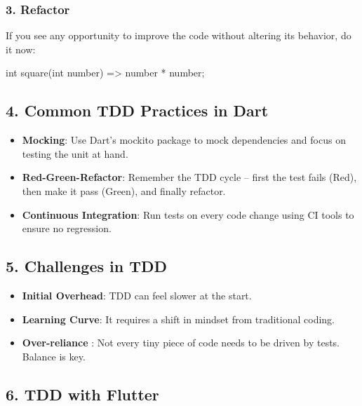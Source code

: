 \documentclass[
]{article}
\newenvironment{Shaded}{\begin{snugshade}}{\end{snugshade}}
\newcommand{\DataTypeTok}[1]{\textcolor[rgb]{0.16,0.50,0.73}{#1}}
\newcommand{\NormalTok}[1]{\textcolor[rgb]{0.81,0.81,0.76}{#1}}
\newcommand{\OperatorTok}[1]{\textcolor[rgb]{0.81,0.81,0.76}{#1}}
\providecommand{\tightlist}{%
  \setlength{\itemsep}{0pt}\setlength{\parskip}{0pt}}
\begin{document}
\subsubsection{3. Refactor}\label{refactor}

If you see any opportunity to improve the code without altering its
behavior, do it now:

\begin{Shaded}
\begin{Highlighting}[]
\DataTypeTok{int}\NormalTok{ square(}\DataTypeTok{int}\NormalTok{ number) }\OperatorTok{=\textgreater{}}\NormalTok{ number }\OperatorTok{*}\NormalTok{ number;}
\end{Highlighting}
\end{Shaded}

\subsection{4. Common TDD Practices in
Dart}\label{common-tdd-practices-in-dart}

\begin{itemize}
\tightlist
\item
  \textbf{Mocking}: Use Dart's mockito package to mock dependencies and
  focus on testing the unit at hand.
\item
  \textbf{Red-Green-Refactor}: Remember the TDD cycle -- first the test
  fails (Red), then make it pass (Green), and finally refactor.
\item
  \textbf{Continuous Integration}: Run tests on every code change using
  CI tools to ensure no regression.
\end{itemize}

\subsection{5. Challenges in TDD}\label{challenges-in-tdd}

\begin{itemize}
\tightlist
\item
  \textbf{Initial Overhead}: TDD can feel slower at the start.
\item
  \textbf{Learning Curve}: It requires a shift in mindset from
  traditional coding.
\item
  \textbf{Over-reliance} : Not every tiny piece of code needs to be
  driven by tests. Balance is key.
\end{itemize}

\subsection{6. TDD with Flutter}\label{tdd-with-flutter}
\end{document}
